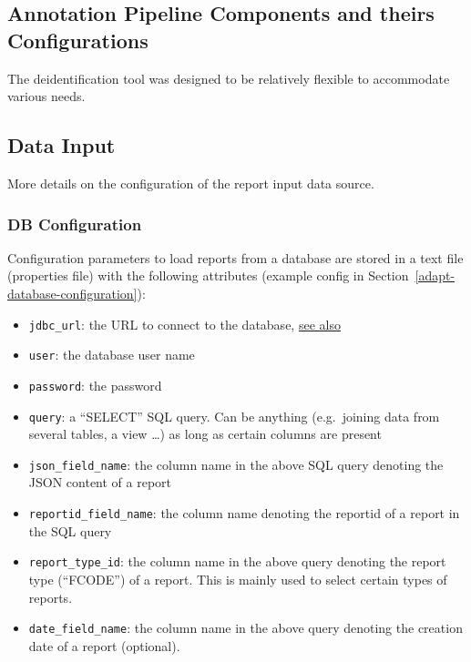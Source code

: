\subsection{Annotation Pipeline Components and theirs
Configurations}\label{annotation-pipeline-components-and-theirs-configurations}

The deidentification tool was designed to be relatively flexible to
accommodate various needs.

\subsection{Data Input}\label{data-input}

More details on the configuration of the report input data source.

\subsubsection{DB Configuration}\label{db-configuration}

Configuration parameters to load reports from a database are stored in a
text file (properties file) with the following attributes
(example config in Section~\ref{adapt-database-configuration}):

\begin{itemize}
\tightlist
\item
  \texttt{jdbc\_url}: the URL to connect to the database,
  \href{https://docs.oracle.com/javase/tutorial/jdbc/basics/connecting.html}{see
  also}
\item
  \texttt{user}: the database user name
\item
  \texttt{password}: the password
\item
  \texttt{query}: a ``SELECT'' SQL query. Can be anything (e.g.~joining
  data from several tables, a view \ldots) as long as certain columns
  are present
\item
  \texttt{json\_field\_name}: the column name in the above SQL query
  denoting the JSON content of a report
\item
  \texttt{reportid\_field\_name}: the column name denoting the reportid
  of a report in the SQL query
\item
  \texttt{report\_type\_id}: the column name in the above query denoting
  the report type (``FCODE'') of a report. This is mainly used to select
  certain types of reports.
\item
  \texttt{date\_field\_name}: the column name in the above query
  denoting the creation date of a report (optional).
\end{itemize}

